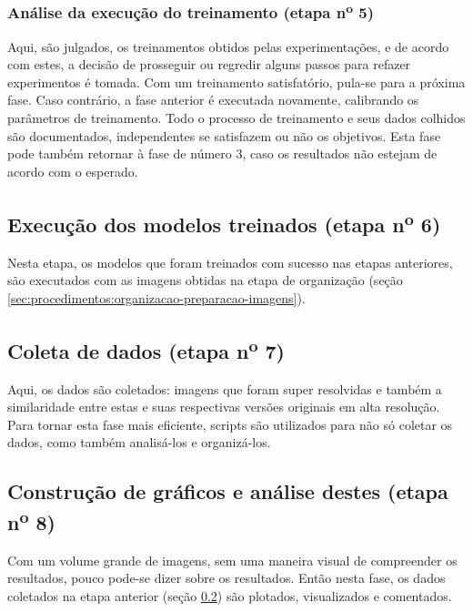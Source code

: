\subsubsection{Análise da execução do treinamento (etapa n\textsuperscript{o} 5)}

Aqui, são julgados, os treinamentos obtidos pelas experimentações, e de acordo com estes, a decisão de prosseguir ou regredir alguns passos para refazer experimentos é tomada. Com um treinamento satisfatório, pula-se para a próxima fase. Caso contrário, a fase anterior é executada novamente, calibrando os parâmetros de treinamento. Todo o processo de treinamento e seus dados colhidos são documentados, independentes se satisfazem ou não os objetivos. Esta fase pode também retornar à fase de número 3, caso os resultados não estejam de acordo com o esperado.

\subsection{Execução dos modelos treinados (etapa n\textsuperscript{o} 6)}
\label{sec:procedimentos:execucao-modelo-treinado}

Nesta etapa, os modelos que foram treinados com sucesso nas etapas anteriores, são executados com as imagens obtidas na etapa de organização (seção \ref{sec:procedimentos:organizacao-preparacao-imagens}).

\subsection{Coleta de dados (etapa n\textsuperscript{o} 7)}
\label{sec:procedimentos:coleta-dados}

Aqui, os dados são coletados: imagens que foram super resolvidas e também a similaridade entre estas e suas respectivas versões originais em alta resolução. Para tornar esta fase mais eficiente, scripts são utilizados para não só coletar os dados, como também analisá-los e organizá-los.

\subsection{Construção de gráficos e análise destes (etapa n\textsuperscript{o} 8)}
\label{sec:procedimentos:graficos-analise}

Com um volume grande de imagens, sem uma maneira visual de compreender os resultados, pouco pode-se dizer sobre os resultados. Então nesta fase, os dados coletados na etapa anterior (seção \ref{sec:procedimentos:coleta-dados}) são plotados, visualizados e comentados. 

